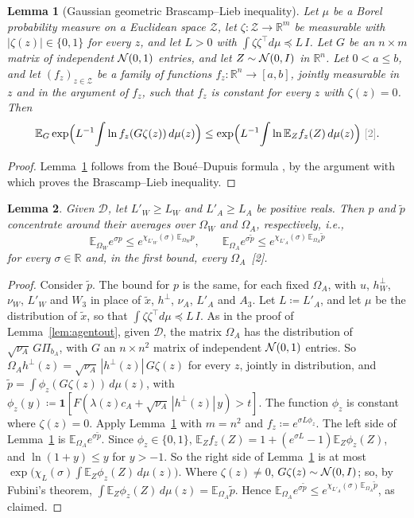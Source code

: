 \documentclass[10pt]{article}
\newcommand{\leanmark}[1]{{\relscale{0.78}\color{gray}[#1]}}
\newtheorem{lemma}{Lemma}
\newcommand{\RR}{\mathbb{R}}
\newcommand{\Dd}{\mathcal{D}}\newcommand{\Ee}{\mathcal{E}}
\newcommand{\EE}{\mathbb{E}}
\begin{document}
\begin{lemma}[Gaussian geometric Brascamp--Lieb inequality]\label{lem:gbl}
  Let $\mu$ be a Borel probability measure on a Euclidean space
  $\mathcal Z$, let
  $\zeta:\mathcal Z\to\RR^m$ be measurable with $|\zeta(z)|\in\{0,1\}$ for every $z$,
  and let $L>0$ with $\int\zeta\zeta^\top d\mu\preceq L\,I$. Let $G$ be an
  $n\times m$ matrix of independent $\mathcal{N}(0,1)$ entries, and let
  $Z\sim\mathcal{N}(0,I)$ in $\RR^n$. Let $0<a\le b$, and let $(f_z)_{z\in\mathcal Z}$ be
  a family of functions $f_z:\RR^n\to[a,b]$, jointly measurable in $z$ and in the argument of $f_z$, such
  that $f_z$ is constant for every $z$ with $\zeta(z)=0$. Then
  \[\EE_G\exp\Bigl(L^{-1}\!\int\ln f_z(G\zeta(z))\,d\mu(z)\Bigr)
  \le\exp\Bigl(L^{-1}\!\int\ln\EE_Zf_z(Z)\,d\mu(z)\Bigr)~\leanmark{2}.\]
\end{lemma}
\begin{proof}
Lemma~\ref{lem:gbl} follows from the Bou\'e--Dupuis formula
\citep[Proposition~1.1]{lehec-2014}, by the argument with which
\citet[Section~2]{lehec-2014} proves the Brascamp--Lieb inequality.
\end{proof}
\begin{lemma}\label{lem:conc}
  Given $\Dd$, let $L'_W\ge L_W$ and $L'_A\ge L_A$ be positive reals. Then
  $p$ and $\tilde p$ concentrate around their averages over $\Omega_W$ and
  $\Omega_A$, respectively, i.e.,
  \[\EE_{\Omega_W}e^{\sigma p}\le e^{\chi_{L'_W}(\sigma)\,\EE_{\Omega_W}p},\qquad
  \EE_{\Omega_A}e^{\sigma\tilde p}\le e^{\chi_{L'_A}(\sigma)\,\EE_{\Omega_A}\tilde p}\]
  for every $\sigma\in\RR$ and, in the first bound, every
  $\Omega_A$~\leanmark{2}.
\end{lemma}
\begin{proof}
Consider $\tilde p$. The bound for $p$ is the same, for each fixed
$\Omega_A$, with $u$, $h_W^\perp$, $\nu_W$, $L'_W$ and $W_3$ in place of
$\tilde x$, $h^\perp$, $\nu_A$, $L'_A$ and $A_3$. Let $L\coloneqq L'_A$, and
let $\mu$ be the distribution of $\tilde x$, so that
$\int\zeta\zeta^\top d\mu\preceq L\,I$. As in the proof of
Lemma~\ref{lem:agentout}, given $\Dd$, the matrix $\Omega_A$ has the
distribution of $\sqrt{\nu_A}\,G\Pi_{b_A}$, with $G$ an $n\times n^2$ matrix of
independent $\mathcal{N}(0,1)$ entries. So
$\Omega_Ah^\perp(z)=\sqrt{\nu_A}\,|h^\perp(z)|\,G\zeta(z)$ for every $z$,
jointly in distribution, and $\tilde p=\int\phi_z(G\zeta(z))\,d\mu(z)$, with
$\phi_z(y)\coloneqq\mathbf 1[F(\lambda(z)c_A+\sqrt{\nu_A}\,|h^\perp(z)|\,y)>t]$.
The function $\phi_z$ is constant where $\zeta(z)=0$. Apply
Lemma~\ref{lem:gbl} with $m=n^2$ and $f_z\coloneqq e^{\sigma L\phi_z}$. The
left side of Lemma~\ref{lem:gbl} is
$\EE_{\Omega_A}e^{\sigma\tilde p}$. Since $\phi_z\in\{0,1\}$,
$\EE_Zf_z(Z)=1+(e^{\sigma L}-1)\EE_Z\phi_z(Z)$, and $\ln(1+y)\le y$ for
$y>-1$. So the right side of Lemma~\ref{lem:gbl} is at most
$\exp\bigl(\chi_L(\sigma)\int\EE_Z\phi_z(Z)\,d\mu(z)\bigr)$. Where
$\zeta(z)\ne0$, $G\zeta(z)\sim\mathcal{N}(0,I)$; so, by Fubini's theorem,
$\int\EE_Z\phi_z(Z)\,d\mu(z)=\EE_{\Omega_A}\tilde p$. Hence
$\EE_{\Omega_A}e^{\sigma\tilde p}\le e^{\chi_{L'_A}(\sigma)\,\EE_{\Omega_A}\tilde p}$,
as claimed.
\end{proof}
\end{document}
